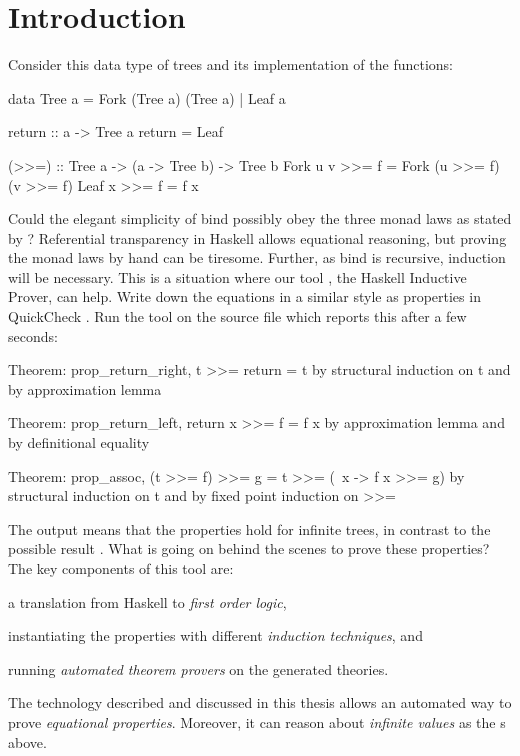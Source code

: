 
\chapter{Introduction}


Consider this data type of trees and its implementation
of the  \citep{mtl} functions:

\begin{code}
data Tree a = Fork (Tree a) (Tree a) | Leaf a

return :: a -> Tree a
return = Leaf

(>>=) :: Tree a -> (a -> Tree b) -> Tree b
Fork u v >>= f = Fork (u >>= f) (v >>= f)
Leaf x   >>= f = f x
\end{code}

\noindent
Could the elegant simplicity of bind possibly obey the three monad
laws as stated by \cite{essenceoffp}? Referential transparency in
Haskell allows equational reasoning, but proving the monad laws by
hand can be tiresome. Further, as bind is recursive, induction will be
necessary. This is a situation where our tool , the Haskell
Inductive Prover, can help. Write down the equations in a similar
style as properties in QuickCheck \citep{quickcheck}. Run the tool on
the source file which reports this after a few seconds:

\begin{code}
Theorem: prop_return_right, t >>= return = t
  by structural induction on t and by approximation lemma

Theorem: prop_return_left, return x >>= f = f x
  by approximation lemma and by definitional equality

Theorem: prop_assoc, (t >>= f) >>= g = t >>= (\ x -> f x >>= g)
  by structural induction on t and by fixed point induction on >>=
\end{code}

\noindent
The output  means that the properties hold for infinite
trees, in contrast to the possible result .
What is going on behind the scenes to prove these properties? The key
components of this tool are:

\begin{enumerate}
{\setlength\itemindent{18pt} \item a translation from Haskell to \emph{first order logic},}
{\setlength\itemindent{18pt} \item instantiating the properties with different \emph{induction techniques}, and}
{\setlength\itemindent{18pt} \item running \emph{automated theorem provers} on the generated theories.}
\end{enumerate}
The technology described and discussed in this thesis allows an
automated way to prove \emph{equational properties}. Moreover, it can
reason about \emph{infinite values} as the s above.

